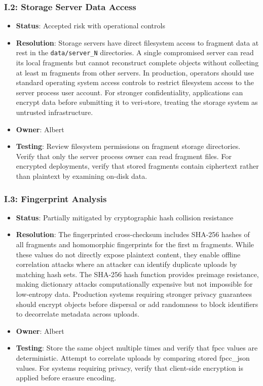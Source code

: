 \documentclass[../veristore_security_model.tex]{subfiles}
\begin{document}
\subsubsection{I.2: Storage Server Data Access}
\begin{itemize}
\item \textbf{Status}: Accepted risk with operational controls
\item \textbf{Resolution}: Storage servers have direct filesystem access to fragment data at rest in the \newline \texttt{data/server\_N} directories. A single compromised server can read its local fragments but cannot reconstruct complete objects without collecting at least m fragments from other servers. In production, operators should use standard operating system access controls to restrict filesystem access to the server process user account. For stronger confidentiality, applications can encrypt data before submitting it to veri-store, treating the storage system as untrusted infrastructure.
\item \textbf{Owner}: Albert
\item \textbf{Testing}: Review filesystem permissions on fragment storage directories. Verify that only the server process owner can read fragment files. For encrypted deployments, verify that stored fragments contain ciphertext rather than plaintext by examining on-disk data.
\end{itemize}

\subsubsection{I.3: Fingerprint Analysis}
\begin{itemize}
\item \textbf{Status}: Partially mitigated by cryptographic hash collision resistance
\item \textbf{Resolution}: The fingerprinted cross-checksum includes SHA-256 hashes of all fragments and homomorphic fingerprints for the first m fragments. While these values do not directly expose plaintext content, they enable offline correlation attacks where an attacker can identify duplicate uploads by matching hash sets. The SHA-256 hash function provides preimage resistance, making dictionary attacks computationally expensive but not impossible for low-entropy data. Production systems requiring stronger privacy guarantees should encrypt objects before dispersal or add randomness to block identifiers to decorrelate metadata across uploads.
\item \textbf{Owner}: Albert
\item \textbf{Testing}: Store the same object multiple times and verify that fpcc values are deterministic. Attempt to correlate uploads by comparing stored fpcc\_json values. For systems requiring privacy, verify that client-side encryption is applied before erasure encoding.
\end{itemize}
\end{document}
